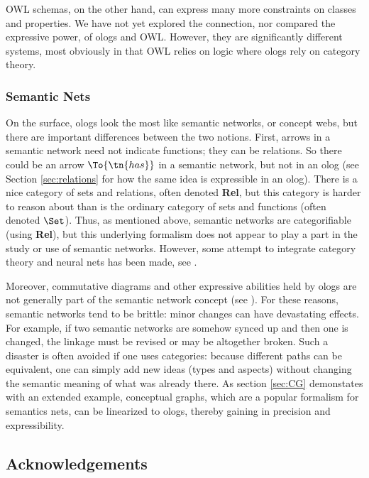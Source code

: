 OWL schemas, on the other hand, can express many more constraints on classes and properties. We have not yet explored the connection, nor compared the expressive power, of ologs and OWL. However, they are significantly different systems, most obviously in that OWL relies on logic where ologs rely on category theory. 

\subsubsection{Semantic Nets}

On the surface, ologs look the most like semantic networks, or concept webs, but there are important differences between the two notions. First, arrows in a semantic network need not indicate functions; they can be relations. So there could be an arrow $\To{\tn{has}}$ in a semantic network, but not in an olog (see Section \ref{sec:relations} for how the same idea is expressible in an olog). There is a nice category of sets and relations, often denoted {\bf Rel}, but this category is harder to reason about than is the ordinary category of sets and functions (often denoted $\Set$). Thus, as mentioned above, semantic networks are categorifiable (using {\bf Rel}), but this underlying formalism does not appear to play a part in the study or use of semantic networks. However, some attempt to integrate category theory and neural nets has been made, see \cite{HC}.

Moreover, commutative diagrams and other expressive abilities held by ologs are not generally part of the semantic network concept (see \cite{Sow}). For these reasons, semantic networks tend to be brittle: minor changes can have devastating effects. For example, if two semantic networks are somehow synced up and then one is changed, the linkage must be revised or may be altogether broken. Such a disaster is often avoided if one uses categories: because different paths can be equivalent, one can simply add new ideas (types and aspects) without changing the semantic meaning of what was already there.
As section \ref{sec:CG} demonstates with an extended example,
conceptual graphs, which are a popular formalism for semantics nets,
can be linearized to ologs, thereby gaining in precision and expressibility.

\subsection{Acknowledgements}\label{sec:acknowledgements}


